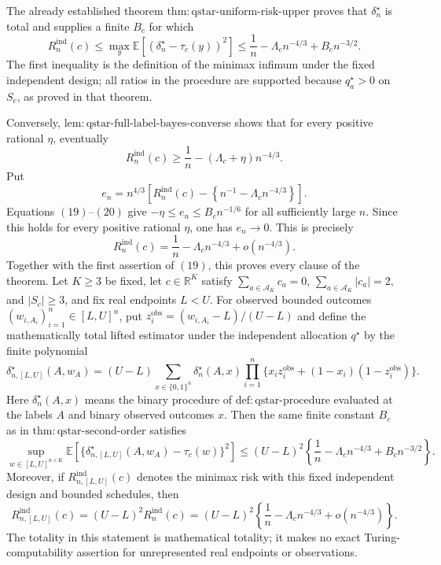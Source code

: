 The already established theorem \(\mathrm{thm:qstar\text{-}uniform\text{-}risk\text{-}upper}\) proves that \(\delta_n^\star\) is total and supplies a finite \(B_c\) for which
\[
R_n^{\mathrm{ind}}(c)
\le\max_y\mathbb E[(\delta_n^\star-\tau_c(y))^2]
\le\frac1n-\Lambda_cn^{-4/3}+B_cn^{-3/2}.
\tag{19}
\]
The first inequality is the definition of the minimax infimum under the fixed independent design; all ratios in the procedure are supported because \(q_a^\star>0\) on \(S_c\), as proved in that theorem.

Conversely, \(\mathrm{lem:qstar\text{-}full\text{-}label\text{-}bayes\text{-}converse}\) shows that for every positive rational \(\eta\), eventually
\[
R_n^{\mathrm{ind}}(c)
\ge\frac1n-(\Lambda_c+\eta)n^{-4/3}.
\tag{20}
\]
Put
\[
e_n=n^{4/3}\left[R_n^{\mathrm{ind}}(c)
-\left\{n^{-1}-\Lambda_cn^{-4/3}\right\}\right].
\]
Equations \((19)\)--\((20)\) give \(-\eta\le e_n\le B_cn^{-1/6}\) for all sufficiently large \(n\). Since this holds for every positive rational \(\eta\), one has \(e_n\to0\). This is precisely
\[
R_n^{\mathrm{ind}}(c)
=\frac1n-\Lambda_cn^{-4/3}+o(n^{-4/3}).
\]
Together with the first assertion of \((19)\), this proves every clause of the theorem.
Let \(K\ge3\) be fixed, let \(c\in\mathbb R^K\) satisfy \(\sum_{a\in\mathcal A_K}c_a=0\), \(\sum_{a\in\mathcal A_K}|c_a|=2\), and \(|S_c|\ge3\), and fix real endpoints \(L<U\). For observed bounded outcomes \((w_{i,A_i})_{i=1}^n\in[L,U]^n\), put \(z_i^{\mathrm{obs}}=(w_{i,A_i}-L)/(U-L)\) and define the mathematically total lifted estimator under the independent allocation \(q^\star\) by the finite polynomial
\[
\delta_{n,[L,U]}^\star(A,w_A)
=(U-L)\sum_{x\in\{0,1\}^n}
 \delta_n^\star(A,x)
 \prod_{i=1}^n
 \{x_i z_i^{\mathrm{obs}}+(1-x_i)(1-z_i^{\mathrm{obs}})\}.
\tag{1}
\]
Here \(\delta_n^\star(A,x)\) means the binary procedure of \(\mathrm{def:qstar\text{-}procedure}\) evaluated at the labels \(A\) and binary observed outcomes \(x\). Then the same finite constant \(B_c\) as in \(\mathrm{thm:qstar\text{-}second\text{-}order}\) satisfies
\[
\sup_{w\in[L,U]^{n\times K}}
\mathbb E\!\left[
 \{\delta_{n,[L,U]}^\star(A,w_A)-\tau_c(w)\}^2
\right]
\le (U-L)^2\left\{
 \frac1n-\Lambda_cn^{-4/3}+B_cn^{-3/2}
\right\}.
\tag{2}
\]
Moreover, if \(R_{n,[L,U]}^{\mathrm{ind}}(c)\) denotes the minimax risk with this fixed independent design and bounded schedules, then
\[
R_{n,[L,U]}^{\mathrm{ind}}(c)
=(U-L)^2R_n^{\mathrm{ind}}(c)
=(U-L)^2\left\{
 \frac1n-\Lambda_cn^{-4/3}+o(n^{-4/3})
\right\}.
\tag{3}
\]
The totality in this statement is mathematical totality; it makes no exact Turing-computability assertion for unrepresented real endpoints or observations.
